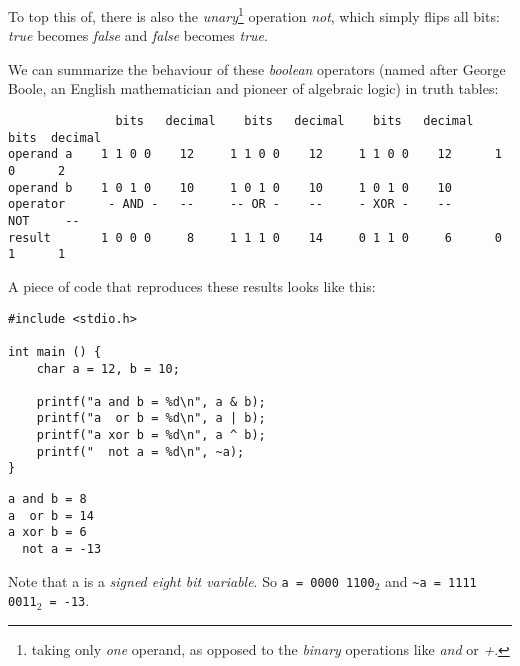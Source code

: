{To top this of, there is also the \emph{unary}\footnote{\ie taking only \emph{one} operand, as opposed to the \emph{binary} operations like \emph{and} or \emph{+}.} operation \emph{not}, which simply flips all bits: \emph{true} becomes \emph{false} and \emph{false} becomes \emph{true}.

We can summarize the behaviour of these \emph{boolean} operators (named after George Boole, an English mathematician and pioneer of algebraic logic) in truth tables:
\begin{defbox}
\begin{verbatim}
               bits   decimal    bits   decimal    bits   decimal   bits  decimal
operand a    1 1 0 0    12     1 1 0 0    12     1 1 0 0    12      1 0      2
operand b    1 0 1 0    10     1 0 1 0    10     1 0 1 0    10
operator      - AND -   --     -- OR -    --     - XOR -    --      NOT     --
result       1 0 0 0     8     1 1 1 0    14     0 1 1 0     6      0 1      1
\end{verbatim}
\end{defbox}

A piece of code that reproduces these results looks like this:
\begin{tcbraster}[raster columns=2,
                  raster equal height,
                  nobeforeafter,
                  raster column skip=0.2cm]
\begin{codebox}
\begin{verbatim}
#include <stdio.h>

int main () {
    char a = 12, b = 10;
    
    printf("a and b = %d\n", a & b);
    printf("a  or b = %d\n", a | b);
    printf("a xor b = %d\n", a ^ b);
    printf("  not a = %d\n", ~a);
}
\end{verbatim}
\end{codebox}
%
\begin{cmdbox}
\begin{verbatim}
a and b = 8
a  or b = 14
a xor b = 6
  not a = -13
\end{verbatim}
\end{cmdbox}
\end{tcbraster}
Note that a  is a \emph{signed eight bit variable}. So \texttt{a = 0000 1100$_2$} and \texttt{\textasciitilde a = 1111 0011$_2$ = -13}.

}
